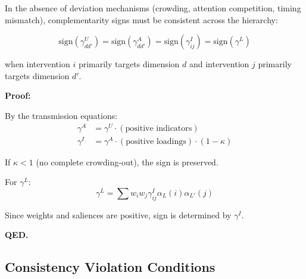 \begin{theorem}
\label{thm:gtc-sign}

In the absence of deviation mechanisms (crowding, attention competition, timing
mismatch), complementarity signs must be consistent across the hierarchy:

\begin{equation}
\boxed{
\text{sign}(\gamma^U_{dd'}) = \text{sign}(\gamma^A_{dd'}) = \text{sign}(\gamma^I_{ij}) = \text{sign}(\gamma^L)
}
\end{equation}

when intervention $i$ primarily targets dimension $d$ and intervention $j$
primarily targets dimension $d'$.

\textbf{Proof:}

By the transmission equations:
\begin{align}
\gamma^A &= \gamma^U \cdot (\text{positive indicators}) \\
\gamma^I &= \gamma^A \cdot (\text{positive loadings}) \cdot (1 - \kappa)
\end{align}

If $\kappa < 1$ (no complete crowding-out), the sign is preserved.

For $\gamma^L$:
\begin{equation}
\gamma^L = \sum w_i w_j \gamma^I_{ij} \alpha_L(i) \alpha_{L'}(j)
\end{equation}

Since weights and saliences are positive, sign is determined by $\gamma^I$.

\textbf{QED.}
\end{theorem}

\subsection{Consistency Violation Conditions}

